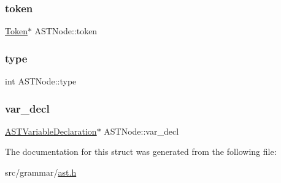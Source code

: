 \hypertarget{structASTNode_a21259aab48ee3cf3e50dcd7c68c347b6}{}\label{structASTNode_a21259aab48ee3cf3e50dcd7c68c347b6} 
\subsubsection{\texorpdfstring{token}{token}}
{\footnotesize\ttfamily \hyperlink{structToken}{Token}$\ast$ A\+S\+T\+Node\+::token}

\hypertarget{structASTNode_a511b8dc176b14b334d4bf6dddc84ca32}{}\label{structASTNode_a511b8dc176b14b334d4bf6dddc84ca32} 
\subsubsection{\texorpdfstring{type}{type}}
{\footnotesize\ttfamily int A\+S\+T\+Node\+::type}

\hypertarget{structASTNode_a15d33dae46f38a469b189522ff24ed38}{}\label{structASTNode_a15d33dae46f38a469b189522ff24ed38} 
\subsubsection{\texorpdfstring{var\+\_\+decl}{var\_decl}}
{\footnotesize\ttfamily \hyperlink{structASTVariableDeclaration}{A\+S\+T\+Variable\+Declaration}$\ast$ A\+S\+T\+Node\+::var\+\_\+decl}



The documentation for this struct was generated from the following file\+:\begin{DoxyCompactItemize}
\item 
src/grammar/\hyperlink{ast_8h}{ast.\+h}\end{DoxyCompactItemize}
